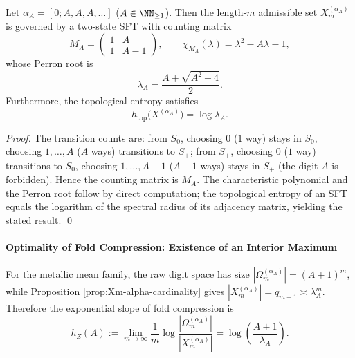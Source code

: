 \begin{proposition}\label{prop:metallic-two-state-sft}
Let $\alpha_A=[0;A,A,A,\dots]$ ($A\in\NN_{\ge 1}$). Then the length-$m$ admissible set $X_m^{(\alpha_A)}$ is governed by a two-state SFT with counting matrix
\[
M_A=
\begin{pmatrix}
1 & A\\
1 & A-1
\end{pmatrix},
\qquad
\chi_{M_A}(\lambda)=\lambda^2-A\lambda-1,
\]
whose Perron root is
\[
\lambda_A=\frac{A+\sqrt{A^2+4}}{2}.
\]
Furthermore, the topological entropy satisfies
\[
h_{\mathrm{top}}\bigl(X^{(\alpha_A)}\bigr)=\log\lambda_A.
\]
\end{proposition}
\begin{proof}
The transition counts are: from $S_0$, choosing $0$ ($1$ way) stays in $S_0$, choosing $1,\dots,A$ ($A$ ways) transitions to $S_+$; from $S_+$, choosing $0$ ($1$ way) transitions to $S_0$, choosing $1,\dots,A-1$ ($A-1$ ways) stays in $S_+$ (the digit $A$ is forbidden). Hence the counting matrix is $M_A$.
The characteristic polynomial and the Perron root follow by direct computation; the topological entropy of an SFT equals the logarithm of the spectral radius of its adjacency matrix, yielding the stated result. \qed
\end{proof}

\paragraph{Optimality of Fold Compression: Existence of an Interior Maximum}
For the metallic mean family, the raw digit space has size $|\Omega_m^{(\alpha_A)}|=(A+1)^m$, while Proposition \ref{prop:Xm-alpha-cardinality} gives
\(
|X_m^{(\alpha_A)}|=q_{m+1}\asymp \lambda_A^m
\).
Therefore the exponential slope of fold compression is
\[
h_Z(A):=\lim_{m\to\infty}\frac{1}{m}\log\frac{|\Omega_m^{(\alpha_A)}|}{|X_m^{(\alpha_A)}|}
=\log\!\left(\frac{A+1}{\lambda_A}\right).
\]

